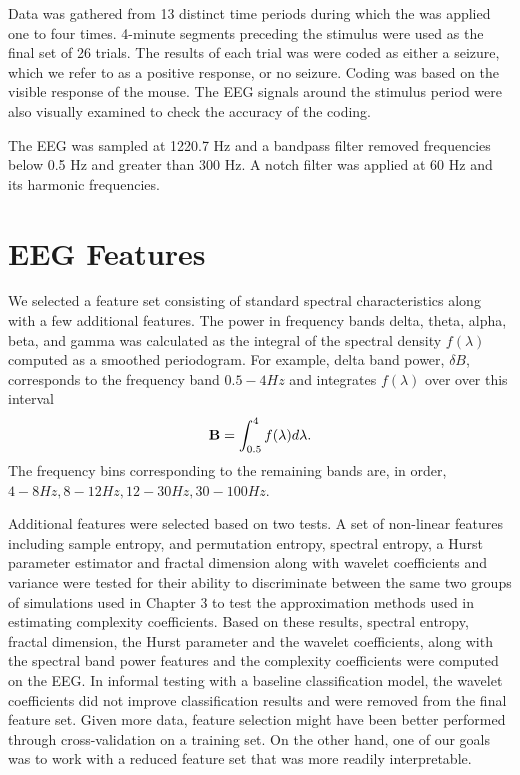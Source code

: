 Data was gathered from 13 distinct time periods during which the was applied one to four times. 
4-minute segments preceding the stimulus were used as the final set of 26 trials. The results of each 
trial was were coded as either a seizure, which 
we refer to as a positive response, or no seizure. 
Coding was based on the visible response of the 
mouse. The EEG signals around the stimulus period were also visually examined to check the accuracy of the coding.

The EEG was sampled at 1220.7 Hz and
a bandpass filter removed frequencies below 0.5 Hz and greater
than 300 Hz. A notch filter was applied at 60 Hz and its harmonic frequencies. 


\section{EEG Features}
We selected a feature set consisting of standard 
spectral characteristics along with a few additional 
features. The power in frequency bands 
delta, theta, alpha, beta, and gamma was calculated 
as the integral of the spectral density $f(\lambda)$ 
computed as a smoothed periodogram. For example, 
delta band power, $\delta B$, corresponds to 
the frequency band $0.5-4Hz$ and integrates  
$f(\lambda)$ over over this interval
\[
  \mathbf{B} = \int_{0.5}^{4} f(\lambda) d\lambda. 
\]
The frequency bins corresponding to the remaining bands are, 
in order,$ 4-8Hz, 8-12Hz, 12-30Hz, 30-100Hz$. 

Additional features were selected based on two tests.
A set of non-linear features including sample entropy,
and permutation entropy, spectral entropy, a Hurst 
parameter estimator and fractal dimension along with wavelet coefficients  and variance were tested for their ability to discriminate between the same two groups of simulations used in Chapter 3 to test the approximation methods used in estimating complexity coefficients. Based on these results, spectral entropy, fractal dimension, the Hurst parameter and the wavelet coefficients, along with the spectral band power features and the complexity coefficients were computed on the EEG. In informal testing
with a baseline classification model, the wavelet coefficients did not improve classification results and were removed from the final feature set. Given more data, feature selection might have been better performed through cross-validation on a training set. On the other hand, one of our goals was to work with a reduced feature set that was more readily interpretable. 

